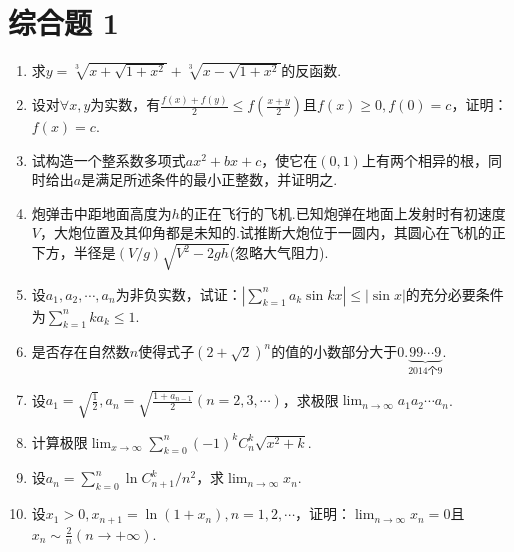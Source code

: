\section{综合题 1}
\begin{enumerate}
	\item 求$y = \sqrt [ 3 ] { x + \sqrt { 1 + x ^ { 2 } } } + \sqrt [ 3 ] { x - \sqrt { 1 + x ^ { 2 } } }$的反函数.
	\item 设对$\forall x,y$为实数，有$\frac { f ( x ) + f ( y ) } { 2 } \leqslant f \left( \frac { x + y } { 2 } \right)$且$f ( x ) \geqslant 0 , f ( 0 ) = c$，证明：$f(x)=c$.
	\item 试构造一个整系数多项式$a x ^ { 2 } + b x + c$，使它在$(0,1)$上有两个相异的根，同时给出$a$是满足所述条件的最小正整数，并证明之.
	\item 炮弹击中距地面高度为$h$的正在飞行的飞机.已知炮弹在地面上发射时有初速度$V$，大炮位置及其仰角都是未知的.试推断大炮位于一圆内，其圆心在飞机的正下方，半径是$( V / g ) \sqrt { V ^ { 2 } - 2 g h }$(忽略大气阻力).
	\item 设$a _ { 1 } , a _ { 2 } , \cdots , a _ { n }$为非负实数，试证：$\left| \sum _ { k = 1 } ^ { n } a _ { k } \sin k x \right| \leqslant | \sin x |$的充分必要条件为$\sum _ { k = 1 } ^ { n } k a _ { k } \leqslant 1$.
	\item 是否存在自然数$n$使得式子$( 2 + \sqrt { 2 } ) ^ { n }$的值的小数部分大于$0 . \underbrace { 99 \cdots 9 } _ { 2014 \text{个} 9 }$.
	\item 设$a _ { 1 } = \sqrt { \frac { 1 } { 2 } } , a _ { n } = \sqrt { \frac { 1 + a _ { n - 1 } } { 2 } } ( n = 2,3 , \cdots )$，求极限$\lim _ { n \rightarrow \infty } a _ { 1 } a _ { 2 } \cdots a _ { n }$.
	\item 计算极限$\lim _ { x \rightarrow \infty } \sum _ { k = 0 } ^ { n } ( - 1 ) ^ { k } C _ { n } ^ { k } \sqrt { x ^ { 2 } + k }$.
	\item 设$a _ { n } = \sum _ { k = 0 } ^ { n } \ln C _ { n + 1 } ^ { k } / n ^ { 2 }$，求$\lim_{ n \rightarrow \infty }x_{n}$.
	\item 设$x _ { 1 } > 0 , x _ { n + 1 } = \ln \left( 1 + x _ { n } \right) , n = 1,2 , \cdots$，证明：$\lim _ { n \rightarrow \infty } x _ { n } = 0$且$x _ { n } \sim \frac { 2 } { n } ( n \rightarrow + \infty )$.

\end{enumerate}
